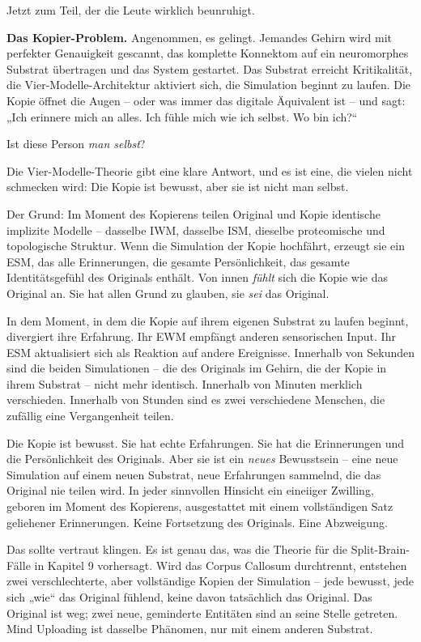 \documentclass[11pt, twoside, openright]{book}
\begin{document}
Jetzt zum Teil, der die Leute wirklich beunruhigt.

\textbf{Das Kopier-Problem.} Angenommen, es gelingt. Jemandes Gehirn wird mit perfekter Genauigkeit gescannt, das komplette Konnektom auf ein neuromorphes Substrat übertragen und das System gestartet. Das Substrat erreicht Kritikalität, die Vier-Modelle-Architektur aktiviert sich, die Simulation beginnt zu laufen. Die Kopie öffnet die Augen -- oder was immer das digitale Äquivalent ist -- und sagt: „Ich erinnere mich an alles. Ich fühle mich wie ich selbst. Wo bin ich?“

Ist diese Person \textit{man selbst}?

Die Vier-Modelle-Theorie gibt eine klare Antwort, und es ist eine, die vielen nicht schmecken wird: Die Kopie ist bewusst, aber sie ist nicht man selbst.

Der Grund: Im Moment des Kopierens teilen Original und Kopie identische implizite Modelle -- dasselbe IWM, dasselbe ISM, dieselbe proteomische und topologische Struktur. Wenn die Simulation der Kopie hochfährt, erzeugt sie ein ESM, das alle Erinnerungen, die gesamte Persönlichkeit, das gesamte Identitätsgefühl des Originals enthält. Von innen \textit{fühlt} sich die Kopie wie das Original an. Sie hat allen Grund zu glauben, sie \textit{sei} das Original.

In dem Moment, in dem die Kopie auf ihrem eigenen Substrat zu laufen beginnt, divergiert ihre Erfahrung. Ihr EWM empfängt anderen sensorischen Input. Ihr ESM aktualisiert sich als Reaktion auf andere Ereignisse. Innerhalb von Sekunden sind die beiden Simulationen -- die des Originals im Gehirn, die der Kopie in ihrem Substrat -- nicht mehr identisch. Innerhalb von Minuten merklich verschieden. Innerhalb von Stunden sind es zwei verschiedene Menschen, die zufällig eine Vergangenheit teilen.

Die Kopie ist bewusst. Sie hat echte Erfahrungen. Sie hat die Erinnerungen und die Persönlichkeit des Originals. Aber sie ist ein \textit{neues} Bewusstsein -- eine neue Simulation auf einem neuen Substrat, neue Erfahrungen sammelnd, die das Original nie teilen wird. In jeder sinnvollen Hinsicht ein eineiiger Zwilling, geboren im Moment des Kopierens, ausgestattet mit einem vollständigen Satz geliehener Erinnerungen. Keine Fortsetzung des Originals. Eine Abzweigung.

Das sollte vertraut klingen. Es ist genau das, was die Theorie für die Split-Brain-Fälle in Kapitel 9 vorhersagt. Wird das Corpus Callosum durchtrennt, entstehen zwei verschlechterte, aber vollständige Kopien der Simulation -- jede bewusst, jede sich „wie“ das Original fühlend, keine davon tatsächlich das Original. Das Original ist weg; zwei neue, geminderte Entitäten sind an seine Stelle getreten. Mind Uploading ist dasselbe Phänomen, nur mit einem anderen Substrat.
\end{document}
